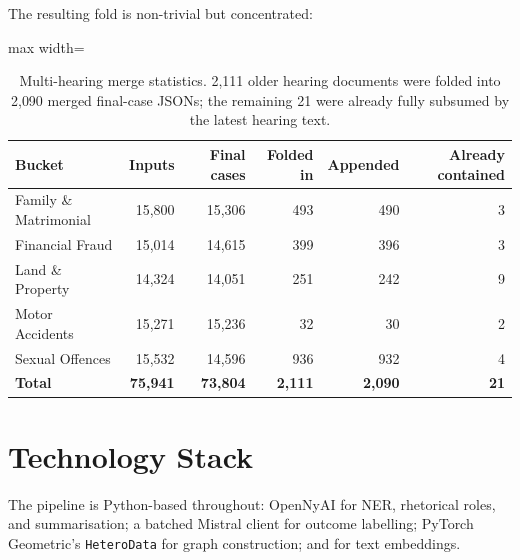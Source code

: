 The resulting fold is non-trivial but concentrated:

\begin{table}[H]
  \centering
  \small
  \begin{adjustbox}{max width=\textwidth}
  \begin{tabular}{lrrrrr}
    \toprule
    Bucket & Inputs & Final cases & Folded in & Appended & Already contained \\
    \midrule
    Family \& Matrimonial & 15{,}800 & 15{,}306 & 493 & 490 & 3 \\
    Financial Fraud & 15{,}014 & 14{,}615 & 399 & 396 & 3 \\
    Land \& Property & 14{,}324 & 14{,}051 & 251 & 242 & 9 \\
    Motor Accidents & 15{,}271 & 15{,}236 & 32 & 30 & 2 \\
    Sexual Offences & 15{,}532 & 14{,}596 & 936 & 932 & 4 \\
    \midrule
    \textbf{Total} & \textbf{75{,}941} & \textbf{73{,}804} & \textbf{2{,}111}
      & \textbf{2{,}090} & \textbf{21} \\
    \bottomrule
  \end{tabular}
  \end{adjustbox}
  \caption{Multi-hearing merge statistics. 2{,}111 older hearing documents were
  folded into 2{,}090 merged final-case JSONs; the remaining 21 were already
  fully subsumed by the latest hearing text.}
  \label{tab:merge_stats}
\end{table}


\section{Technology Stack}

The pipeline is Python-based throughout: OpenNyAI for NER, rhetorical
roles, and summarisation; a batched Mistral client for outcome
labelling; PyTorch Geometric's \texttt{HeteroData} for graph
construction; and  for text embeddings.
